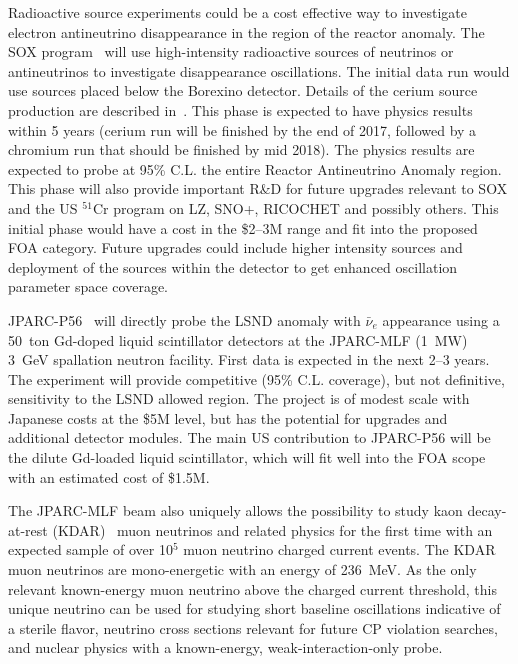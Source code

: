 \noindent Radioactive source experiments could be a cost effective way
to investigate electron antineutrino disappearance in the region of
the reactor anomaly. The SOX program~\cite{bib:SOX} will use
high-intensity radioactive sources of neutrinos or antineutrinos to
investigate disappearance oscillations. The initial data run would
use sources placed below the Borexino detector. Details of the cerium
source production are described in~\cite{bib:CL}. This phase is
expected to have physics results within 5 years (cerium run will be
finished by the end of 2017, followed by a chromium run that should be
finished by mid 2018). The physics results are expected to probe at
95\% C.L. the entire Reactor Antineutrino Anomaly region. This phase
will also provide important R\&D for future upgrades relevant to SOX
and the US $^{51}$Cr program on LZ, SNO+, RICOCHET and possibly
others. This initial phase would have a cost in
the \$2--3M range and fit into the proposed FOA category. 
Future upgrades could include higher intensity sources and deployment
of the sources within the detector to get enhanced oscillation
parameter space coverage.


\noindent JPARC-P56~\cite{JPARC_P_56} will directly probe the LSND
anomaly with $\bar\nu_e$ appearance using a 50~ton Gd-doped liquid
scintillator detectors at the JPARC-MLF (1~MW) 3~GeV spallation neutron
facility. First data is expected in the next 2--3 years. The
experiment will provide competitive (95\% C.L. coverage), but not
definitive, sensitivity to the LSND allowed region. The project is of
modest scale with Japanese costs at the \$5M level, but has the
potential for upgrades and additional detector modules. The main US
contribution to JPARC-P56 will be the dilute Gd-loaded liquid
scintillator, which will fit well into the FOA scope with an estimated
cost of \$1.5M.

The JPARC-MLF beam also uniquely allows the possibility to study kaon
decay-at-rest (KDAR)~\cite{KDAR} muon neutrinos 
and related physics for the first time with an expected sample of over 10$^5$ muon
neutrino charged current events. The KDAR muon neutrinos are
mono-energetic with an energy of 236~MeV. As the only relevant
known-energy muon neutrino above the charged current threshold, this
unique neutrino can be used for studying short baseline oscillations
indicative of a sterile flavor, neutrino cross sections relevant for
future CP violation searches, and nuclear physics with a known-energy,
weak-interaction-only probe.

